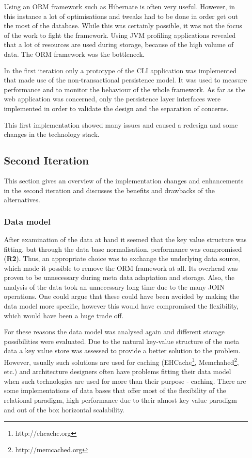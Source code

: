 Using an ORM framework such as Hibernate is often very useful. However, in this instance a lot of optimisations and tweaks had to be done in order get out the most of the database. While this was certainly possible, it was not the focus of the work to fight the framework. Using JVM profiling applications revealed that a lot of resources are used during storage, because of the high volume of data. The ORM framework was the bottleneck.

In the first iteration only a prototype of the CLI application was implemented that made use of the non-transactional persistence model. It was used to measure performance and to monitor the behaviour of the whole framework. As far as the web application was concerned, only the persistence layer interfaces were implemented in order to validate the design and the separation of concerns.

This first implementation showed many issues and caused a redesign and some changes in the technology stack.

\subsection{Second Iteration}
This section gives an overview of the implementation changes and enhancements in the second iteration and discusses the benefits and drawbacks of the alternatives.

\subsubsection{Data model}
After examination of the data at hand it seemed that the key value structure was fitting, but through the data base normalisation, performance was compromised (\textbf{R2}). Thus, an appropriate choice was to exchange the underlying data source, which made it possible to remove the ORM framework at all. Its overhead was proven to be unnecessary during meta data adaptation and storage. Also, the analysis of the data took an unnecessary long time due to the many JOIN operations. One could argue that these could have been avoided by making the data model more specific, however this would have compromised the flexibility, which would have been a huge trade off.

For these reasons the data model was analysed again and different storage possibilities were evaluated.  Due to the natural key-value structure of the meta data a key value store was assessed to provide a better solution to the problem. However, usually such solutions are used for caching (EHCache\footnote{http://ehcache.org}, Memchahed\footnote{http://memcached.org}, etc.) and architecture designers often have problems fitting their data model when such technologies are used for more than their purpose - caching. There are some implementations of data bases that offer most of the flexibility of the relational paradigm, high performance due to their almost key-value paradigm and out of the box horizontal scalability.

